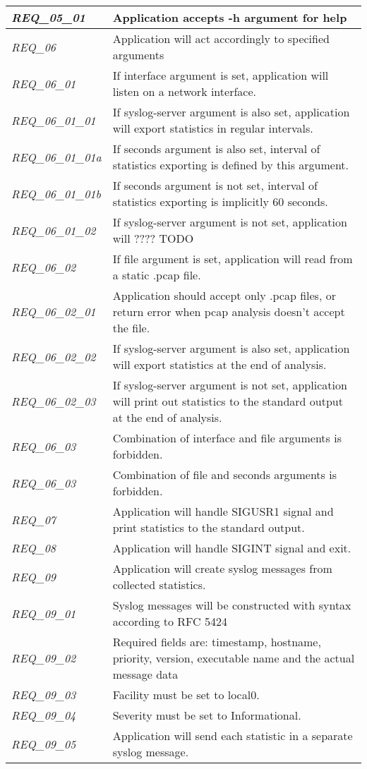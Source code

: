 \begin{table}[H]
{\begin{tabular}{@{}|l|l|@{}}
\textit{REQ\_05\_01} & Application accepts -h argument for help \\ \midrule
\textit{REQ\_06} & Application will act accordingly to specified arguments \\ \midrule
\textit{REQ\_06\_01} & If interface argument is set, application will listen on a network interface. \\ \midrule
\textit{REQ\_06\_01\_01} & If syslog-server argument is also set, application will export statistics in regular intervals. \\ \midrule
\textit{REQ\_06\_01\_01a} & If seconds argument is also set, interval of statistics exporting is defined by this argument. \\ \midrule
\textit{REQ\_06\_01\_01b} & If seconds argument is not set, interval of statistics exporting is implicitly 60 seconds. \\ \midrule
\textit{REQ\_06\_01\_02} & If syslog-server argument is not set, application will ???? TODO \\ \midrule
\textit{REQ\_06\_02} & If file argument is set, application will read from a static .pcap file. \\ \midrule
\textit{REQ\_06\_02\_01} & Application should accept only .pcap files, or return error when pcap analysis doesn't accept the file. \\ \midrule
\textit{REQ\_06\_02\_02} & If syslog-server argument is also set, application will export statistics at the end of analysis. \\ \midrule
\textit{REQ\_06\_02\_03} & If syslog-server argument is not set, application will print out statistics to the standard output at the end of analysis. \\ \midrule
\textit{REQ\_06\_03} & Combination of interface and file arguments is forbidden. \\ \midrule
\textit{REQ\_06\_03} & Combination of file and seconds arguments is forbidden. \\ \midrule
\textit{REQ\_07} & Application will handle SIGUSR1 signal and print statistics to the standard output. \\ \midrule
\textit{REQ\_08} & Application will handle SIGINT signal and exit. \\ \midrule
\textit{REQ\_09} & Application will create syslog messages from collected statistics. \\ \midrule
\textit{REQ\_09\_01} & Syslog messages will be constructed with syntax according to RFC 5424 \\ \midrule
\textit{REQ\_09\_02} & Required fields are: timestamp, hostname, priority, version, executable name and the actual message data \\ \midrule
\textit{REQ\_09\_03} & Facility must be set to local0. \\ \midrule
\textit{REQ\_09\_04} & Severity must be set to Informational. \\ \midrule
\textit{REQ\_09\_05} & Application will send each statistic in a separate syslog message. \\ \midrule
\end{tabular}%
}
\end{table}

